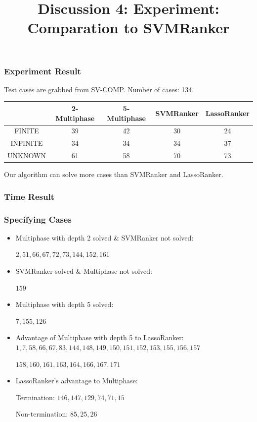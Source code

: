 \documentclass[10pt]{beamer}
\title{Discussion 4: Experiment: Comparation to SVMRanker}
\begin{document}
\maketitle
\begin{frame}\frametitle{Experiment Result}

Test cases are grabbed from SV-COMP. Number of cases: 134.

\begin{center}
\begin{tabular}{|c|c|c|c|c|}
\hline
& 2-Multiphase& 5-Multiphase & SVMRanker & LassoRanker\\
\hline 
FINITE & 39 & 42&30 & 24\\
\hline 

INFINITE & 34& 34&34 & 37\\
\hline

UNKNOWN & 61& 58&70 & 73\\
\hline

\end{tabular}
\end{center}


Our algorithm can solve more cases than SVMRanker and LassoRanker.
\end{frame}

\begin{frame}\frametitle{Time Result}

\end{frame}

\begin{frame}\frametitle{Specifying Cases}
\begin{itemize}
\item Multiphase with depth 2 solved \& SVMRanker not solved:

$2,51,66,67,72,73,144,152,161$
\item SVMRanker solved \& Multiphase not solved:

$159$
\item Multiphase with depth 5 solved:

$7,155,126$
\item Advantage of Multiphase with depth 5 to LassoRanker:
$1,7,58,66,67,83,144,148,149,150,151,152,153,155,156,157$

$158,160,161,163,164,166,167,171$

\item LassoRanker's advantage to Multiphase:

Termination: $146,147,129,74,71,15$

Non-termination: $85,25,26$
\end{itemize}

\end{frame}
\end{document}
